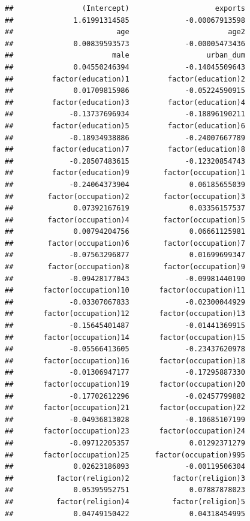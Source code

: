 \documentclass[]{book}
\newenvironment{Shaded}{\begin{snugshade}}{\end{snugshade}}
\theoremstyle{definition}
\theoremstyle{definition}
\theoremstyle{definition}
\theoremstyle{remark}
\begin{document}
\begin{Shaded}
\begin{Highlighting}[]
\begin{Shaded}
\begin{Highlighting}[]
\begin{verbatim}
##                (Intercept)                    exports 
##              1.61991314585             -0.00067913598 
##                        age                       age2 
##              0.00839593573             -0.00005473436 
##                       male                  urban_dum 
##              0.04550246394             -0.14045509643 
##         factor(education)1         factor(education)2 
##              0.01709815986             -0.05224590915 
##         factor(education)3         factor(education)4 
##             -0.13737696934             -0.18896190211 
##         factor(education)5         factor(education)6 
##             -0.18934938886             -0.24007667789 
##         factor(education)7         factor(education)8 
##             -0.28507483615             -0.12320854743 
##         factor(education)9        factor(occupation)1 
##             -0.24064373904              0.06185655039 
##        factor(occupation)2        factor(occupation)3 
##              0.07392167619              0.03356157537 
##        factor(occupation)4        factor(occupation)5 
##              0.00794204756              0.06661125981 
##        factor(occupation)6        factor(occupation)7 
##             -0.07563296877              0.01699699347 
##        factor(occupation)8        factor(occupation)9 
##             -0.09428177043             -0.09981440190 
##       factor(occupation)10       factor(occupation)11 
##             -0.03307067833             -0.02300044929 
##       factor(occupation)12       factor(occupation)13 
##             -0.15645401487             -0.01441369915 
##       factor(occupation)14       factor(occupation)15 
##             -0.05566413605             -0.23437620978 
##       factor(occupation)16       factor(occupation)18 
##             -0.01306947177             -0.17295887330 
##       factor(occupation)19       factor(occupation)20 
##             -0.17702612296             -0.02457799882 
##       factor(occupation)21       factor(occupation)22 
##             -0.04936813028             -0.10685107199 
##       factor(occupation)23       factor(occupation)24 
##             -0.09712205357              0.01292371279 
##       factor(occupation)25      factor(occupation)995 
##              0.02623186093             -0.00119506304 
##          factor(religion)2          factor(religion)3 
##              0.05395952751              0.07887878023 
##          factor(religion)4          factor(religion)5 
##              0.04749150422              0.04318454995 

\end{verbatim}
\end{Highlighting}
\end{Shaded}
\end{Highlighting}
\end{Shaded}
\end{document}
